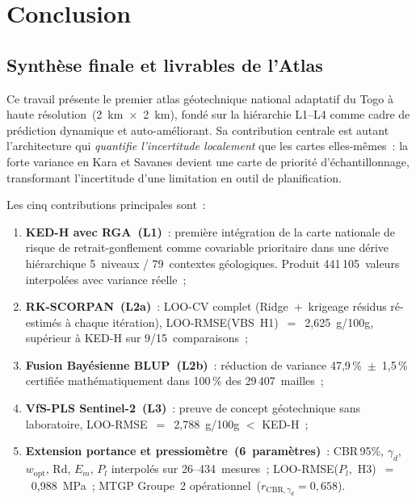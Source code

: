 \documentclass[10pt,a4paper,twocolumn]{article}
\begin{document}
	\section{Conclusion}
	\label{sec:conclusion}
	
	\subsection{Synthèse finale et livrables de l'Atlas}
	
	Ce travail présente le premier atlas géotechnique national adaptatif
	du Togo à haute résolution~(2~km~$\times$~2~km), fondé sur la
	hiérarchie L1--L4 comme cadre de prédiction dynamique et
	auto-améliorant. Sa contribution centrale est autant l'architecture
	qui \emph{quantifie l'incertitude localement} que les cartes elles-mêmes~:
	la forte variance en Kara et Savanes devient une carte de priorité
	d'échantillonnage, transformant l'incertitude d'une limitation en outil
	de planification.
	
	Les cinq contributions principales sont~:
	\begin{enumerate}[noitemsep]
		\item \textbf{KED-H avec RGA~(L1)}~: première intégration
		de la carte nationale de risque de retrait-gonflement comme
		covariable prioritaire dans une dérive hiérarchique 5~niveaux /
		79~contextes géologiques. Produit 441\,105~valeurs interpolées
		avec variance réelle~;
		
		\item \textbf{RK-SCORPAN~(L2a)}~: LOO-CV complet
		(Ridge~$+$~krigeage résidus ré-estimés à chaque itération),
		LOO-RMSE(VBS~H1)~$=$~2{,}625~g/100g, supérieur à KED-H
		sur 9/15~comparaisons~;
		
		\item \textbf{Fusion Bayésienne BLUP~(L2b)}~: réduction de variance
		47{,}9\,\%~$\pm$~1{,}5\,\% certifiée mathématiquement dans
		100\,\% des 29\,407~mailles~;
		
		\item \textbf{VfS-PLS Sentinel-2~(L3)}~: preuve de concept
		géotechnique sans laboratoire,
		LOO-RMSE~$=$~2{,}788~g/100g $<$ KED-H~;
		
		\item \textbf{Extension portance et pressiomètre~(6~paramètres)}~:
		CBR\,95\%, $\gamma_d$, $w_{\mathrm{opt}}$, Rd, $E_m$, $P_l$
		interpolés sur 26--434~mesures~;
		LOO-RMSE($P_l$,~H3)~$=$~0{,}988~MPa~;
		MTGP Groupe~2 opérationnel~($r_{\mathrm{CBR},\gamma_d}=0{,}658$).
	\end{enumerate}
	
\end{document}
